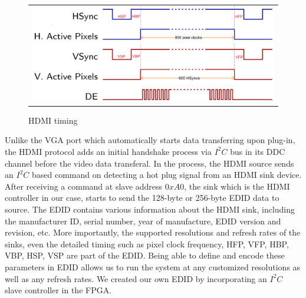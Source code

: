 \documentclass[]{spie}  %
\begin{document}
\begin{figure}
   \begin{center}
   \begin{tabular}{c}
   \includegraphics[width=0.8\linewidth]{wf1.png} 
   \end{tabular}
   \end{center}
   \caption{HDMI timing}%
   \label{Fig:1}%
   \end{figure} 

Unlike the VGA port which automatically starts data transferring upon plug-in, the HDMI protocol adds an initial handshake process via $I^2C$ bus in its DDC channel before the video data transferal. In the process, the HDMI source sends an $I^2C$ based command on detecting a hot plug signal from an HDMI sink device. After receiving a command at slave address $0xA0$, the sink which is the HDMI controller in our case, starts to send the 128-byte or 256-byte EDID data to source. The EDID contains various information about the HDMI sink, including the manufacturer ID, serial number, year of manufacture, EDID version and revision, etc. More importantly, the supported resolutions and refresh rates of the sinks, even the detailed timing such as pixel clock frequency, HFP, VFP, HBP, VBP, HSP, VSP are part of the EDID. Being able to define and encode these parameters in EDID allows us to run the system at any customized resolutions as well as any refresh rates. We created our own EDID by incorporating an $I^2C$ slave controller in the FPGA.
\end{document}
